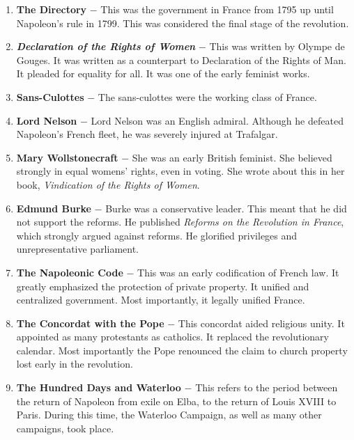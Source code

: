 \documentclass[12pt]{article}
\begin{document}
\begin{enumerate}
\item \textbf{The Directory} $-$ This was the government in France from 1795 up until Napoleon's rule in 1799. This was considered the final stage of the revolution.

\item \textbf{\textit{Declaration of the Rights of Women}} $-$ This was written by Olympe de Gouges. It was written as a counterpart to Declaration of the Rights of Man. It pleaded for equality for all. It was one of the early feminist works. 

\item \textbf{Sans-Culottes} $-$ The sans-culottes were the working class of France.

\item \textbf{Lord Nelson} $-$ Lord Nelson was an English admiral. Although he defeated Napoleon's French fleet, he was severely injured at Trafalgar.

\item \textbf{Mary Wollstonecraft} $-$ She was an early British feminist. She believed strongly in equal womens' rights, even in voting. She wrote about this in her book, \textit{Vindication of the Rights of Women}.

\item \textbf{Edmund Burke} $-$ Burke was a conservative leader. This meant that he did not support the reforms. He published \textit{Reforms on the Revolution in France}, which strongly argued against reforms. He glorified privileges and unrepresentative parliament.

\item \textbf{The Napoleonic Code} $-$ This was an early codification of French law. It greatly emphasized the protection of private property. It unified and centralized government. Most importantly, it legally unified France.

\item \textbf{The Concordat with the Pope} $-$ This concordat aided religious unity. It appointed as many protestants as catholics. It replaced the revolutionary calendar. Most importantly the Pope renounced the claim to church property lost early in the revolution.

\item \textbf{The Hundred Days and Waterloo} $-$ This refers to the period between the return of Napoleon from exile on Elba, to the return of Louis XVIII to Paris. During this time, the Waterloo Campaign, as well as many other campaigns, took place.


\end{enumerate}
\end{document}
